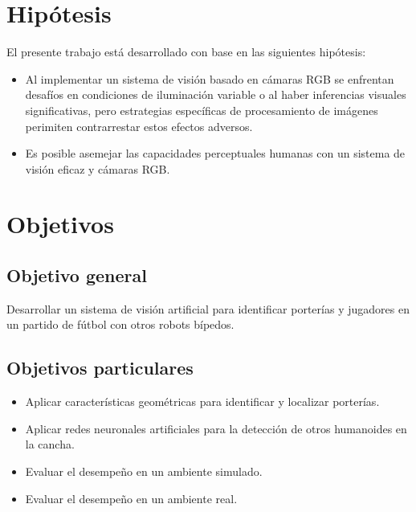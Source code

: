 \section{Hipótesis}
El presente trabajo está desarrollado con base en las siguientes hipótesis:
\begin{itemize}
	\item Al implementar un sistema de visión basado en cámaras RGB se enfrentan desafíos en condiciones de iluminación variable o al haber inferencias visuales significativas, pero estrategias específicas de procesamiento de imágenes perimiten contrarrestar estos efectos adversos.
	\item Es posible asemejar las capacidades perceptuales humanas con un sistema de visión eficaz y cámaras RGB.
\end{itemize}

\section{Objetivos}

\subsection*{Objetivo general}
Desarrollar un sistema de visión artificial para identificar porterías y jugadores en un partido de fútbol con otros robots bípedos.
\subsection*{Objetivos particulares}
\begin{itemize}
    \item Aplicar características geométricas para identificar y localizar porterías.
    \item Aplicar redes neuronales artificiales para la detección de otros humanoides en la cancha.
    \item Evaluar el desempeño en un ambiente simulado.
    \item Evaluar el desempeño en un ambiente real.
\end{itemize}
